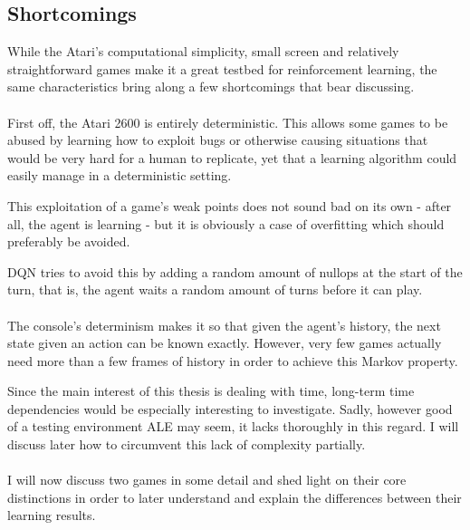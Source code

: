 \subsection{Shortcomings}
\label{sub:shortcomings}
While the Atari's computational simplicity,
small screen
and relatively straightforward games
make it a great testbed for reinforcement learning,
the same characteristics
bring along a few shortcomings
that bear discussing.

\paragraph{}
First off, the Atari 2600
is entirely deterministic.
This allows some games to be abused
by learning how to exploit bugs
or otherwise causing situations
that would be very hard for a human to replicate,
yet that a learning algorithm could easily manage
in a deterministic setting.

This exploitation of a game's weak points
does not sound bad on its own
- after all, the agent is learning -
but it is obviously a case of overfitting
which should preferably be avoided.

DQN tries to avoid this by adding a random amount
of nullops at the start of the turn,
that is, the agent waits a random amount of turns
before it can play.

\paragraph{}
The console's determinism makes it so
that given the agent's history,
the next state given an action
can be known exactly.
However,
very few games actually need more than
a few frames of history
in order to achieve this Markov property.

Since the main interest of this thesis
is dealing with time,
long-term time dependencies would be especially interesting to investigate.
Sadly, however good of a testing environment ALE may seem,
it lacks thoroughly in this regard.
I will discuss later how to circumvent this lack of complexity partially.

\paragraph{}
I will now discuss two games in some detail
and shed light on their core distinctions
in order to later understand and explain
the differences between their learning results.

